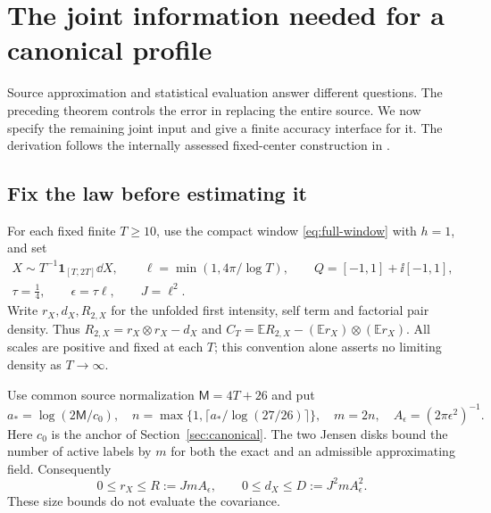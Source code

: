 \section{The joint information needed for a canonical profile}\label{sec:joint-source}

Source approximation and statistical evaluation answer different questions.
The preceding theorem controls the error in replacing the entire source.
We now specify the remaining joint input and give a finite accuracy
interface for it. The derivation follows the internally assessed
fixed-center construction in \cite{OCJoint,OCJointReview}.

\subsection{Fix the law before estimating it}

For each fixed finite $T\ge10$, use the compact window
\eqref{eq:full-window} with $h=1$, and set
\begin{equation}\label{eq:fixed-regime}
 \begin{gathered}
 X\sim T^{-1}\mathbf1_{[T,2T]}\dd X,\qquad
 \ell=\min(1,4\pi/\log T),\qquad Q=[-1,1]+\ii[-1,1],\\
 \tau=\tfrac14,\qquad\epsilon=\tau\ell,\qquad J=\ell^2.
 \end{gathered}
\end{equation}
Write $r_X,d_X,R_{2,X}$ for the unfolded first intensity, self term
and factorial pair density. Thus $R_{2,X}=r_X\otimes r_X-d_X$ and
$C_T=\mathbb E R_{2,X}-(\mathbb E r_X)\otimes(\mathbb E r_X)$.
All scales are positive and fixed at each $T$; this convention alone
asserts no limiting density as $T\to\infty$.

Use common source normalization $\mathsf M=4T+26$ and put
\[
 a_* =\log(2\mathsf M/c_0),\quad
 n=\max\{1,\lceil a_*/\log(27/26)\rceil\},\quad
 m=2n,\quad A_\epsilon=(2\pi\epsilon^2)^{-1}.
\]
Here $c_0$ is the anchor of Section~\ref{sec:canonical}.
The two Jensen disks bound the number of active labels by $m$ for
both the exact and an admissible approximating field. Consequently
\begin{equation}\label{eq:joint-population}
 0\le r_X\le R:=JmA_\epsilon,\qquad
 0\le d_X\le D:=J^2mA_\epsilon^2.
\end{equation}
These size bounds do not evaluate the covariance.


